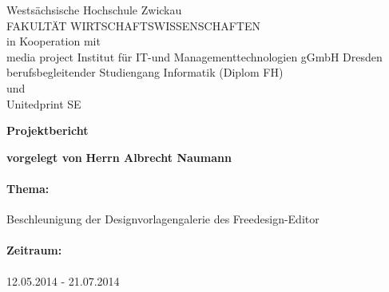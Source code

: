 \begin {titlepage}
\begin {center}
\small{
	Westsächsische Hochschule Zwickau \\
	FAKULTÄT  WIRTSCHAFTSWISSENSCHAFTEN\\
	\vspace{7pt}
	in Kooperation mit\\
	\vspace{7pt}
	media project Institut für IT-und Managementtechnologien gGmbH Dresden\\
    berufsbegleitender Studiengang Informatik (Diplom FH)\\
    und\\
    Unitedprint SE\\
}
\vspace{50pt}

\LARGE{\textbf{Projektbericht}}

\vspace{8pt}
\Large{\textbf{vorgelegt von}}
\Large{\textbf{Herrn Albrecht Naumann}}
\end{center}
\vspace{10pt}
\paragraph{Thema:}
\large{
\begin{center}
Beschleunigung der Designvorlagengalerie des Freedesign-Editor
\end{center}
}
\paragraph{Zeitraum:}
\large{
\begin{center}
12.05.2014 - 21.07.2014
\end{center}
}
\end{titlepage}

